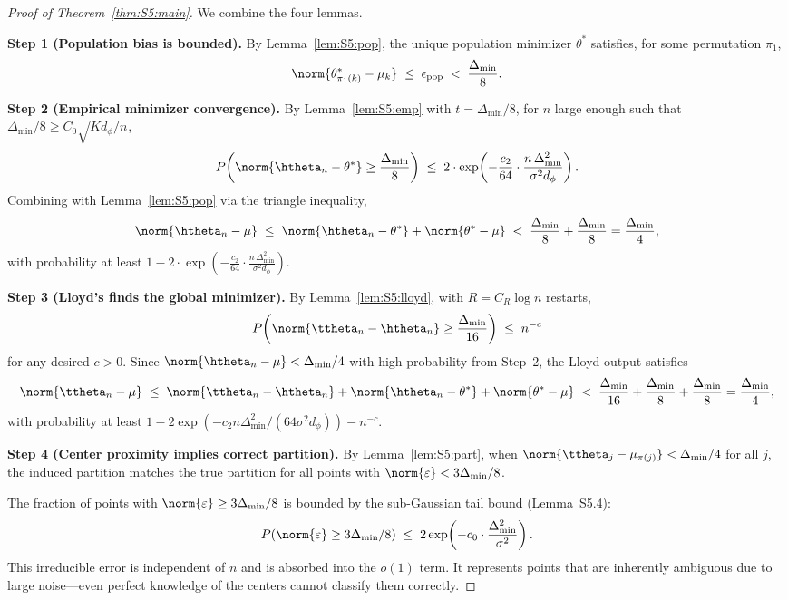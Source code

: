 \begin{proof}[Proof of Theorem~\ref{thm:S5:main}]
We combine the four lemmas.

\noindent\textbf{Step 1 (Population bias is bounded).}
By Lemma~\ref{lem:S5:pop}, the unique population minimizer $\theta^*$
satisfies, for some permutation $\pi_1$,
\[
\norm{\theta^*_{\pi_1(k)}-\muk} \;\le\; \epsilon_{\mathrm{pop}}
\;<\; \frac{\Delta_{\min}}{8}.
\]

\noindent\textbf{Step 2 (Empirical minimizer convergence).}
By Lemma~\ref{lem:S5:emp} with $t=\Delta_{\min}/8$, for $n$ large
enough such that $\Delta_{\min}/8\ge C_0\sqrt{K d_\phi/n}$,
\[
P\!\left(\norm{\htheta_n-\theta^*}\ge\frac{\Delta_{\min}}{8}\right)
\;\le\; 2\cdot\exp\!\left(
          -\frac{c_2}{64}\cdot\frac{n\,\Delta_{\min}^2}{\sigma^2 d_\phi}\right).
\]
Combining with Lemma~\ref{lem:S5:pop} via the triangle inequality,
\[
\norm{\htheta_n-\mu}
\;\le\; \norm{\htheta_n-\theta^*} + \norm{\theta^*-\mu}
\;<\; \frac{\Delta_{\min}}{8} + \frac{\Delta_{\min}}{8}
= \frac{\Delta_{\min}}{4},
\]
with probability at least
$1-2\cdot\exp\!\left(-\frac{c_2}{64}\cdot\frac{n\,\Delta_{\min}^2}{\sigma^2 d_\phi}\right)$.

\noindent\textbf{Step 3 (Lloyd's finds the global minimizer).}
By Lemma~\ref{lem:S5:lloyd}, with $R=C_R\log n$ restarts,
\[
P\!\left(\norm{\ttheta_n-\htheta_n}\ge\frac{\Delta_{\min}}{16}\right)
\;\le\; n^{-c}
\]
for any desired $c>0$.  Since $\norm{\htheta_n-\mu}<\Delta_{\min}/4$
with high probability from Step~2, the Lloyd output satisfies
\[
\norm{\ttheta_n-\mu}
\;\le\; \norm{\ttheta_n-\htheta_n}
      + \norm{\htheta_n-\theta^*}
      + \norm{\theta^*-\mu}
\;<\; \frac{\Delta_{\min}}{16}
     + \frac{\Delta_{\min}}{8}
     + \frac{\Delta_{\min}}{8}
= \frac{\Delta_{\min}}{4},
\]
with probability at least
$1-2\exp\!\left(-c_2 n\Delta_{\min}^2/(64\sigma^2 d_\phi)\right)-n^{-c}$.

\noindent\textbf{Step 4 (Center proximity implies correct partition).}
By Lemma~\ref{lem:S5:part}, when
$\norm{\ttheta_j-\mu_{\pi(j)}}<\Delta_{\min}/4$ for all $j$, the induced
partition matches the true partition for all points with
$\norm{\varepsilon}<3\Delta_{\min}/8$.

The fraction of points with $\norm{\varepsilon}\ge3\Delta_{\min}/8$ is
bounded by the sub-Gaussian tail bound (Lemma~S5.4):
\[
P(\norm{\varepsilon}\ge3\Delta_{\min}/8)
\;\le\; 2\exp\!\left(-c_0\cdot\frac{\Delta_{\min}^2}{\sigma^2}\right).
\]
This irreducible error is independent of $n$ and is absorbed into the
$o(1)$ term.  It represents points that are inherently ambiguous due to
large noise---even perfect knowledge of the centers cannot classify them
correctly.


\end{proof}
